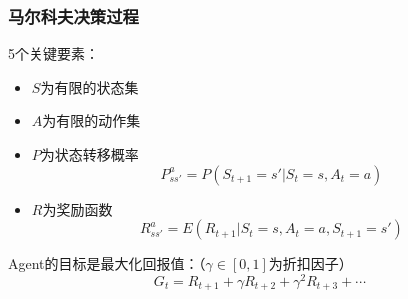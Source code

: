 \subsubsection{马尔科夫决策过程}
\begin{note}
    5个关键要素：
    \begin{itemize}
        \item $S$为有限的状态集
        \item $A$为有限的动作集
        \item $P$为状态转移概率
        \[
            P_{ss'}^{a} = P\left( S_{t+1}=s'|S_t = s,A_t = a \right)
        \]
        \item $R$为奖励函数
        \[
            R_{ss'}^{a} = E\left( R_{t+1}|S_t = s,A_t = a,S_{t+1} = s' \right)
        \]
    \end{itemize}
    Agent的目标是最大化回报值：（$\gamma\in[0,1]$为折扣因子）
    \[
        G_t = R_{t+1}+\gamma R_{t+2}+\gamma^2R_{t+3}+\cdots
    \]
\end{note}
